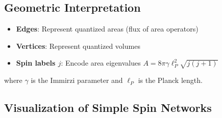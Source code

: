 \documentclass[12pt,a4paper]{article}
\theoremstyle{definition}
\begin{document}
\subsection{Geometric Interpretation}

\begin{tcolorbox}[colback=lightblue!10,colframe=deepblue,title=Physical Interpretation]
\begin{itemize}
    \item \textbf{Edges}: Represent quantized areas (flux of area operators)
    \item \textbf{Vertices}: Represent quantized volumes
    \item \textbf{Spin labels $j$}: Encode area eigenvalues $A = 8\pi\gamma\ell_P^2\sqrt{j(j+1)}$
\end{itemize}
where $\gamma$ is the Immirzi parameter and $\ell_P$ is the Planck length.
\end{tcolorbox}

\subsection{Visualization of Simple Spin Networks}
\end{document}
